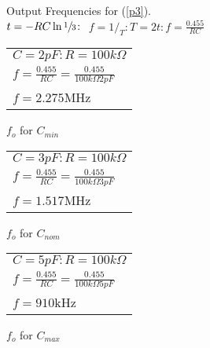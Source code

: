\documentclass{article}
\begin{document}
\begin{enumerate}
\begin{figure}[h]     
\centering
\caption{Output Frequencies for (\ref{p3}).\\
		$t = -RC \ln {\sfrac{1}{3}} \colon $
		$f = 1/_T \colon T = 2 t \colon f = \frac{0.455}{RC}$}
	\begin{subtable}[b]{0.3\textwidth}
		\centering
		\begin{tabular}{ l }
			$C = 2pF \colon R = 100k\Omega$\\
			$f = \frac{0.455}{RC} = \frac{0.455}{100k\Omega 2pF}$\\
			$f = 2.275$MHz
		\end{tabular}
	  	\caption{$f_o$ for $C_{min}$}
	\end{subtable}
	\begin{subtable}[b]{0.3\textwidth}
		\centering
		\begin{tabular}{ l }
			$C = 3pF \colon R = 100k\Omega$\\
			$f = \frac{0.455}{RC} = \frac{0.455}{100k\Omega 3pF}$\\
			$f = 1.517$MHz
		\end{tabular}
		\caption{$f_o$ for $C_{nom}$} 
	\end{subtable}
	\begin{subtable}[b]{0.3\textwidth}
		\centering
		\begin{tabular}{ l }
			$C = 5pF \colon R = 100k\Omega$\\
			$f = \frac{0.455}{RC} = \frac{0.455}{100k\Omega 5pF}$\\
			$f = 910$kHz
		\end{tabular}
		\caption{$f_o$ for $C_{max}$}
	\end{subtable}

\end{figure}



\end{enumerate}
\end{document}

